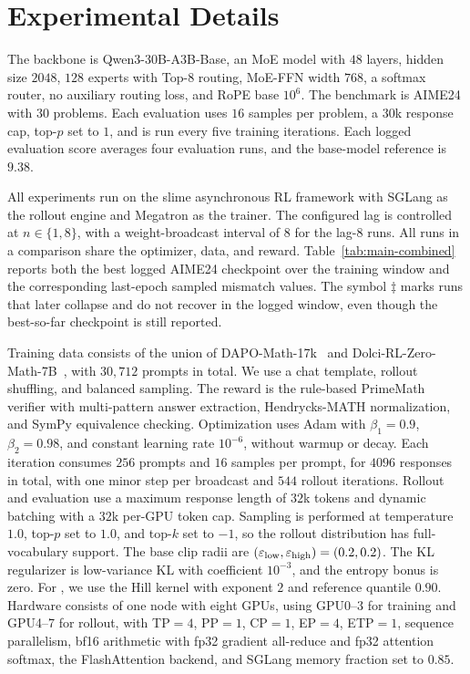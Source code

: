 \section{Experimental Details}
\label{app:expdetails}

The backbone is Qwen3-30B-A3B-Base, an MoE model with $48$ layers, hidden size $2048$, $128$ experts with Top-$8$ routing, MoE-FFN width $768$, a softmax router, no auxiliary routing loss, and RoPE base $10^6$. The benchmark is AIME24 with $30$ problems. Each evaluation uses $16$ samples per problem, a $30$k response cap, top-$p$ set to $1$, and is run every five training iterations. Each logged evaluation score averages four evaluation runs, and the base-model reference is $9.38$.

All experiments run on the slime asynchronous RL framework with SGLang as the rollout engine and Megatron as the trainer. The configured lag is controlled at $n\in\{1,8\}$, with a weight-broadcast interval of $8$ for the lag-$8$ runs. All runs in a comparison share the optimizer, data, and reward. Table~\ref{tab:main-combined} reports both the best logged AIME24 checkpoint over the training window and the corresponding last-epoch sampled mismatch values. The symbol $\ddagger$ marks runs that later collapse and do not recover in the logged window, even though the best-so-far checkpoint is still reported.

Training data consists of the union of DAPO-Math-17k~\citep{yu2025dapoopensourcellmreinforcement} and Dolci-RL-Zero-Math-7B~\citep{olmo2026olmo3}, with $30{,}712$ prompts in total. We use a chat template, rollout shuffling, and balanced sampling. The reward is the rule-based PrimeMath verifier with multi-pattern answer extraction, Hendrycks-MATH normalization, and SymPy equivalence checking. Optimization uses Adam with $\beta_1=0.9$, $\beta_2=0.98$, and constant learning rate $10^{-6}$, without warmup or decay. Each iteration consumes $256$ prompts and $16$ samples per prompt, for $4096$ responses in total, with one minor step per broadcast and $544$ rollout iterations. Rollout and evaluation use a maximum response length of $32$k tokens and dynamic batching with a $32$k per-GPU token cap. Sampling is performed at temperature $1.0$, top-$p$ set to $1.0$, and top-$k$ set to $-1$, so the rollout distribution has full-vocabulary support. The base clip radii are $(\varepsilon_{\mathrm{low}},\varepsilon_{\mathrm{high}})=(0.2,0.2)$. The KL regularizer is low-variance KL with coefficient $10^{-3}$, and the entropy bonus is zero. For \satr{}, we use the Hill kernel with exponent $2$ and reference quantile $0.90$. Hardware consists of one node with eight GPUs, using GPU0--3 for training and GPU4--7 for rollout, with TP$=4$, PP$=1$, CP$=1$, EP$=4$, ETP$=1$, sequence parallelism, bf16 arithmetic with fp32 gradient all-reduce and fp32 attention softmax, the FlashAttention backend, and SGLang memory fraction set to $0.85$.

